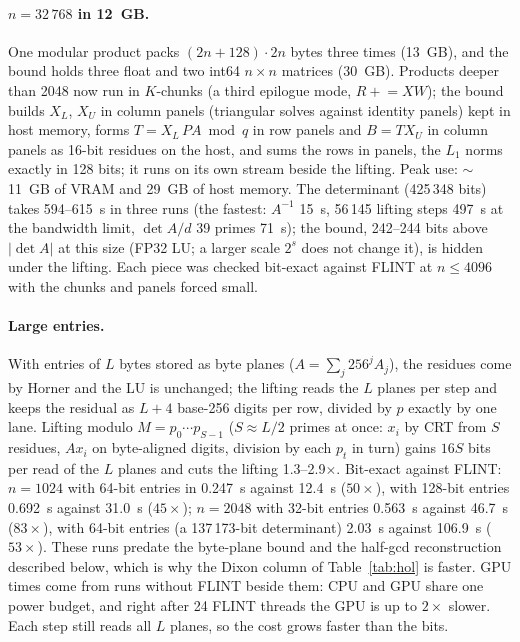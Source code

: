 \documentclass[11pt]{article}
\begin{document}
\paragraph{$n=32\,768$ in 12~GB.} One modular product packs $(2n+128)\cdot 2n$ bytes three times (13~GB), and the bound holds
three float and two int64 $n\times n$ matrices (30~GB). Products deeper than 2048 now run in $K$-chunks (a third epilogue
mode, $R \mathrel{+}= XW$); the bound builds $X_L$, $X_U$ in column panels (triangular solves against identity panels) kept in
host memory, forms $T=X_L\,PA \bmod q$ in row panels and $B=T X_U$ in column panels as 16-bit residues on the host, and sums
the rows in panels, the $L_1$ norms exactly in 128 bits; it runs on its own stream beside the lifting. Peak use: $\sim$11~GB
of VRAM and 29~GB of host memory. The determinant (425\,348 bits) takes 594--615~s in three runs (the fastest: $A^{-1}$ 15~s, 56\,145 lifting steps 497~s at
the bandwidth limit, $\det A/d$ 39 primes 71~s); the bound, 242--244 bits above $|\det A|$ at this size (FP32 LU; a larger scale
$2^s$ does not change it), is hidden under the lifting. Each piece was checked bit-exact against FLINT at $n\le 4096$ with the
chunks and panels forced small.
\paragraph{Large entries.} With entries of $L$ bytes stored as byte planes ($A=\sum_j 256^j A_j$), the residues come by Horner and the LU is
unchanged; the lifting reads the $L$ planes per step and keeps the residual as $L+4$ base-256 digits per row, divided by $p$
exactly by one lane. Lifting modulo $M=p_0\cdots p_{S-1}$ ($S\approx L/2$ primes at once: $x_i$ by CRT from $S$ residues,
$A x_i$ on byte-aligned digits, division by each $p_t$ in turn) gains $16S$ bits per read of the $L$ planes and cuts the
lifting 1.3--2.9$\times$. Bit-exact against FLINT: $n=1024$ with 64-bit entries in 0.247~s against 12.4~s ($50\times$), with
128-bit entries 0.692~s against 31.0~s ($45\times$); $n=2048$ with 32-bit entries 0.563~s against 46.7~s ($83\times$), with
64-bit entries (a 137\,173-bit determinant) 2.03~s against 106.9~s ($53\times$). These runs predate the byte-plane bound and
the half-gcd reconstruction described below, which is why the Dixon column of Table~\ref{tab:hol} is faster. GPU times come
from runs without FLINT beside them: CPU and GPU share one power budget, and right after 24 FLINT threads the GPU is up to $2\times$ slower. Each step still
reads all $L$ planes, so the cost grows faster than the bits.
\end{document}
